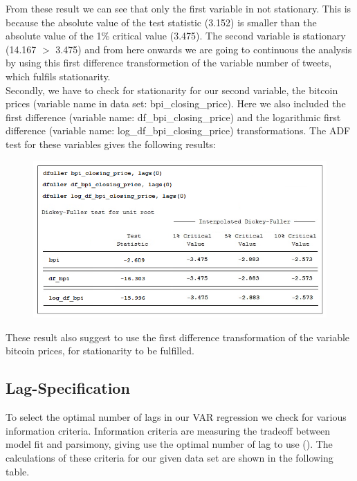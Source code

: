\documentclass[a4paper,american,12pt]{article}
\begin{document}
\begin{spacing}{1.2}
From these result we can see that only the first variable in not stationary. This is because the absolute value of the test statistic (3.152) is smaller than the absolute value of the 1\% critical value (3.475). The second variable is stationary (14.167 $>$ 3.475) and from here onwards we are going to continuous the analysis by using this first difference transformetion of the variable number of tweets, which fulfils stationarity.\\

Secondly, we have to check for stationarity for our second variable, the bitcoin prices (variable name in data set: bpi\_closing\_price). Here we also included the first difference (variable name: df\_bpi\_closing\_price) and the logarithmic first difference (variable name: log\_df\_bpi\_closing\_price) transformations. The ADF test for these variables gives the following results:\\

\begin{figure}[H]
\centering
\graphicspath{ {stata_export_graphs/} }
\includegraphics[scale=0.85]{ADF_bpi_variables.png}
\end{figure}
	
These result also suggest to use the first difference transformation of the variable bitcoin prices, for stationarity to be fulfilled.

\subsection{Lag-Specification}
To select the optimal number of lags in our VAR regression we check for various information criteria. Information criteria are measuring the tradeoff between model fit and parsimony, giving use the optimal number of lag to use (\cite[p.~27]{brandt_williams_2007}). The calculations of these criteria for our given data set are shown in the following table.\\


\end{spacing}
\end{document}

